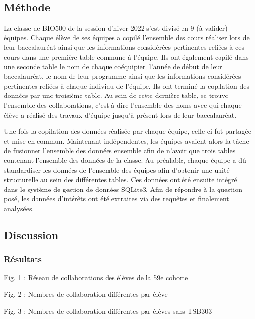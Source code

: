 \documentclass[9pt,twocolumn,twoside,]{pnas-new}
\begin{document}
\hypertarget{muxe9thode}{%
\subsection{Méthode}\label{muxe9thode}}

La classe de BIO500 de la session d'hiver 2022 s'est divisé en 9 (à
valider) équipes. Chaque élève de ses équipes a copilé l'ensemble des
cours réaliser lors de leur baccalauréat ainsi que les informations
considérées pertinentes reliées à ces cours dans une première table
commune à l'équipe. Ils ont également copilé dans une seconde table le
nom de chaque coéquipier, l'année de début de leur baccalauréat, le nom
de leur programme ainsi que les informations considérées pertinentes
reliées à chaque individu de l'équipe. Ils ont terminé la copilation des
données par une troisième table. Au sein de cette dernière table, se
trouve l'ensemble des collaborations, c'est-à-dire l'ensemble des noms
avec qui chaque élève a réalisé des travaux d'équipe jusqu'à présent
lors de leur baccalauréat.

Une fois la copilation des données réalisée par chaque équipe, celle-ci
fut partagée et mise en commun. Maintenant indépendentes, les équipes
avaient alors la tâche de fusionner l'ensemble des données ensemble afin
de n'avoir que trois tables contenant l'ensemble des données de la
classe. Au préalable, chaque équipe a dû standardiser les données de
l'ensemble des équipes afin d'obtenir une unité structurelle au sein des
différentes tables. Ces données ont été ensuite intégré dans le système
de gestion de données SQLite3. Afin de répondre à la question posé, les
données d'intérêts ont été extraites via des requêtes et finalement
analysées.

\hypertarget{discussion}{%
\subsection{Discussion}\label{discussion}}

\hypertarget{ruxe9sultats}{%
\subsubsection{Résultats}\label{ruxe9sultats}}

Fig. 1 : Réseau de collaborations des élèves de la 59e cohorte

Fig. 2 : Nombres de collaboration différentes par élève

Fig. 3 : Nombres de collaboration différentes par élèves sans TSB303
\end{document}
